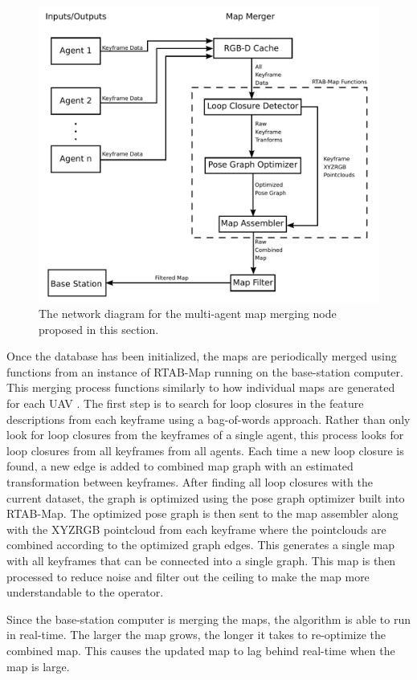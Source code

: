 \documentclass[letterpaper, 10 pt, conference]{ieeeconf}  %
\begin{document}
\begin{figure}
\centering
\includegraphics[width=0.8\linewidth]{map_merger_network}
\caption[The network diagram for the multi-agent map merging node.]{The network diagram for the multi-agent map merging node proposed in this section.}
\label{fig:map_merge}
\end{figure}

Once the database has been initialized, the maps are periodically merged using functions from an instance of RTAB-Map running on the base-station computer. This merging process functions similarly to how individual maps are generated for each UAV \cite{Labbe2011a,Labbe2013,Labbe2019}. The first step is to search for loop closures in the feature descriptions from each keyframe using a bag-of-words approach. Rather than only look for loop closures from the keyframes of a single agent, this process looks for loop closures from all keyframes from all agents. Each time a new loop closure is found, a new edge is added to combined map graph with an estimated transformation between keyframes. After finding all loop closures with the current dataset, the graph is optimized using the pose graph optimizer built into RTAB-Map. The optimized pose graph is then sent to the map assembler along with the XYZRGB pointcloud from each keyframe where the pointclouds are combined according to the optimized graph edges. This generates a single map with all keyframes that can be connected into a single graph. This map is then processed to reduce noise and filter out the ceiling to make the map more understandable to the operator.

Since the base-station computer is merging the maps, the algorithm is able to run in real-time. The larger the map grows, the longer it takes to re-optimize the combined map. This causes the updated map to lag behind real-time when the map is large.
\end{document}
